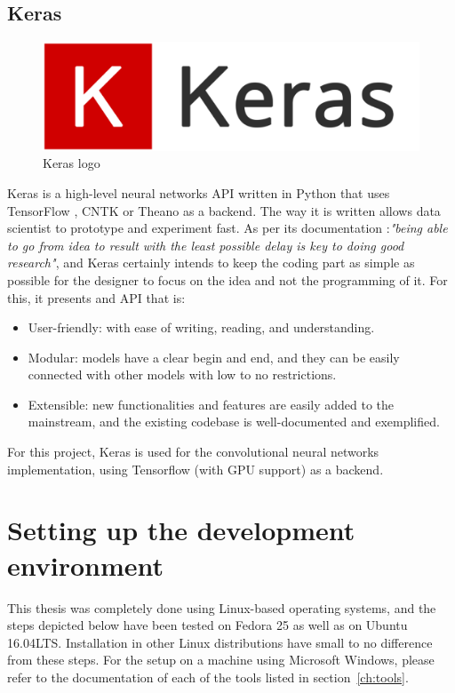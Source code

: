 \subsection{Keras}
\begin{figure}[!ht]
    \centering
    \includegraphics[width=0.5\linewidth]{figures/keras_logo}
    \caption{Keras logo}
    \label{fig:keras_logo}
\end{figure}
Keras is a high-level neural networks API written in Python that uses TensorFlow \cite{TensorFlow}, CNTK \cite{CNTK} or Theano \cite{Theano} as a backend. The way it is written allows data scientist to prototype and experiment fast. As per its documentation \cite{KERAS}:\emph{"being able to go from idea to result with the least possible delay is key to doing good research"}, and Keras certainly intends to keep the coding part as simple as possible for the designer to focus on the idea and not the programming of it. For this, it presents and API that is:

\begin{itemize}
    \item User-friendly: with ease of writing, reading, and understanding.
    \item Modular: models have a clear begin and end, and they can be easily connected with other models with low to no restrictions.
    \item Extensible: new functionalities and features are easily added to the mainstream, and the existing codebase is well-documented and exemplified.
\end{itemize}

For this project, Keras is used for the convolutional neural networks implementation, using Tensorflow (with GPU support) as a backend.

\section{Setting up the development environment}
This thesis was completely done using Linux-based operating systems, and the steps depicted below have been tested on Fedora 25 as well as on Ubuntu 16.04LTS. Installation in other Linux distributions have small to no difference from these steps. For the setup on a machine using Microsoft Windows\texttrademark, please refer to the documentation of each of the tools listed in section~\ref{ch:tools}.\\

